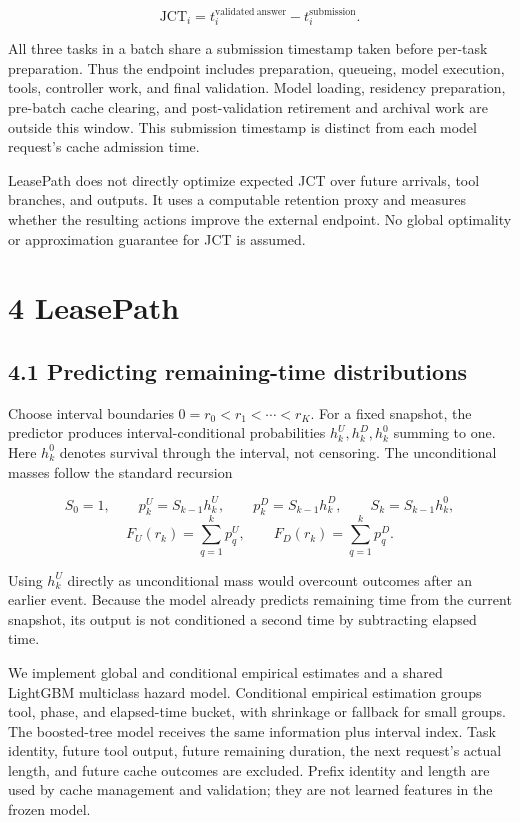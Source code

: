 \documentclass[
  english,
  10pt,
]{article}
\begin{document}
\[
\mathrm{JCT}_i=t_i^{\mathrm{validated\ answer}}-t_i^{\mathrm{submission}}.
\]

All three tasks in a batch share a submission timestamp taken before
per-task preparation. Thus the endpoint includes preparation, queueing,
model execution, tools, controller work, and final validation. Model
loading, residency preparation, pre-batch cache clearing, and
post-validation retirement and archival work are outside this window.
This submission timestamp is distinct from each model request's cache
admission time.

LeasePath does not directly optimize expected JCT over future arrivals,
tool branches, and outputs. It uses a computable retention proxy and
measures whether the resulting actions improve the external endpoint. No
global optimality or approximation guarantee for JCT is assumed.

\section{4 LeasePath}\label{leasepath}

\subsection{4.1 Predicting remaining-time
distributions}\label{predicting-remaining-time-distributions}

Choose interval boundaries \(0=r_0<r_1<\cdots<r_K\). For a fixed
snapshot, the predictor produces interval-conditional probabilities
\(h_k^U,h_k^D,h_k^0\) summing to one. Here \(h_k^0\) denotes survival
through the interval, not censoring. The unconditional masses follow the
standard recursion

\[
S_0=1,\qquad p_k^U=S_{k-1}h_k^U,\qquad
p_k^D=S_{k-1}h_k^D,\qquad S_k=S_{k-1}h_k^0,
\] \[
F_U(r_k)=\sum_{q=1}^{k}p_q^U,\qquad
F_D(r_k)=\sum_{q=1}^{k}p_q^D.
\]

Using \(h_k^U\) directly as unconditional mass would overcount outcomes
after an earlier event. Because the model already predicts remaining
time from the current snapshot, its output is not conditioned a second
time by subtracting elapsed time.

We implement global and conditional empirical estimates and a shared
LightGBM multiclass hazard model. Conditional empirical estimation
groups tool, phase, and elapsed-time bucket, with shrinkage or fallback
for small groups. The boosted-tree model receives the same information
plus interval index. Task identity, future tool output, future remaining
duration, the next request's actual length, and future cache outcomes
are excluded. Prefix identity and length are used by cache management
and validation; they are not learned features in the frozen model.
\end{document}
